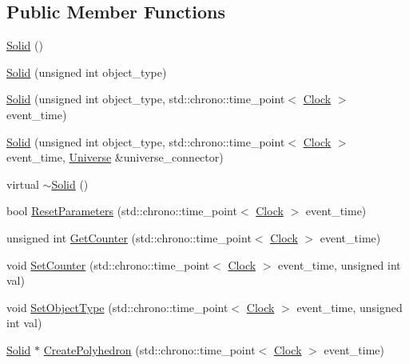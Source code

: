 \subsection*{Public Member Functions}
\begin{DoxyCompactItemize}
\item 
\hyperlink{class_solid_a2cf157c87df66dc3eb8722f9b3ee8f66}{Solid} ()
\item 
\hyperlink{class_solid_a00a71dfc929ca50ee9850bdfca5b3fd6}{Solid} (unsigned int object\+\_\+type)
\item 
\hyperlink{class_solid_a9f5476b751c749af38b349b9fc7e2ba5}{Solid} (unsigned int object\+\_\+type, std\+::chrono\+::time\+\_\+point$<$ \hyperlink{universe_8h_a0ef8d951d1ca5ab3cfaf7ab4c7a6fd80}{Clock} $>$ event\+\_\+time)
\item 
\hyperlink{class_solid_a80746ad255dded6090e648fc3f0dbd93}{Solid} (unsigned int object\+\_\+type, std\+::chrono\+::time\+\_\+point$<$ \hyperlink{universe_8h_a0ef8d951d1ca5ab3cfaf7ab4c7a6fd80}{Clock} $>$ event\+\_\+time, \hyperlink{class_universe}{Universe} \&universe\+\_\+connector)
\item 
virtual \hyperlink{class_solid_a07095e0808c0ef6b206bc70992ef557d}{$\sim$\+Solid} ()
\item 
bool \hyperlink{class_solid_ac43dc78fa7f6a3348fc99751ff6bbc52}{Reset\+Parameters} (std\+::chrono\+::time\+\_\+point$<$ \hyperlink{universe_8h_a0ef8d951d1ca5ab3cfaf7ab4c7a6fd80}{Clock} $>$ event\+\_\+time)
\item 
unsigned int \hyperlink{class_solid_a7ca41431033d05957f8be3f49c3aca23}{Get\+Counter} (std\+::chrono\+::time\+\_\+point$<$ \hyperlink{universe_8h_a0ef8d951d1ca5ab3cfaf7ab4c7a6fd80}{Clock} $>$ event\+\_\+time)
\item 
void \hyperlink{class_solid_aea949040518e505ed39b1456a360c5e0}{Set\+Counter} (std\+::chrono\+::time\+\_\+point$<$ \hyperlink{universe_8h_a0ef8d951d1ca5ab3cfaf7ab4c7a6fd80}{Clock} $>$ event\+\_\+time, unsigned int val)
\item 
void \hyperlink{class_solid_af6fe46af0be9a9533e114b1c0f186bfc}{Set\+Object\+Type} (std\+::chrono\+::time\+\_\+point$<$ \hyperlink{universe_8h_a0ef8d951d1ca5ab3cfaf7ab4c7a6fd80}{Clock} $>$ event\+\_\+time, unsigned int val)
\item 
\hyperlink{class_solid}{Solid} $\ast$ \hyperlink{class_solid_a231b2c469aab60b092fcc3a9525e5c80}{Create\+Polyhedron} (std\+::chrono\+::time\+\_\+point$<$ \hyperlink{universe_8h_a0ef8d951d1ca5ab3cfaf7ab4c7a6fd80}{Clock} $>$ event\+\_\+time)
\item 

\end{DoxyCompactItemize}
